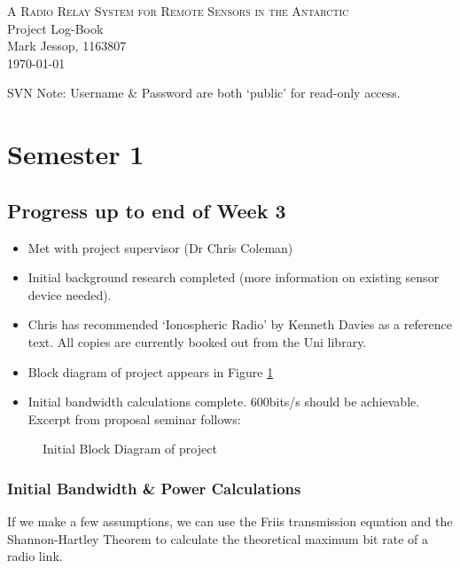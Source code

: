 \documentclass[a4paper,10pt]{article}
\begin{document}
 \begin{center}
	\textsc{\Large{
		A Radio Relay System for Remote Sensors in the Antarctic
	}}
	\ \\
	\Large{
		Project Log-Book
	}
	\ \\
	\large{
		Mark Jessop, 1163807
	}
	\ \\
	\today
 \end{center}
 SVN Note: Username \& Password are both `public' for read-only access.
 \tableofcontents
 \newpage
 
 
\section{Semester 1}
\subsection{Progress up to end of Week 3}
\begin{itemize}
\item Met with project supervisor (Dr Chris Coleman)
\item Initial background research completed (more information on existing sensor device needed).
\item Chris has recommended `Ionospheric Radio' by Kenneth Davies as a reference text. All copies are currently booked out from the Uni library.
\item Block diagram of project appears in Figure \ref{block_diag}
\item Initial bandwidth calculations complete. 600bits/s should be achievable. Excerpt from proposal seminar follows:
\end{itemize}
\begin{figure}[h]
\caption{Initial Block Diagram of project}
\label{block_diag}
\end{figure}
\subsubsection{Initial Bandwidth \& Power Calculations}
If we make a few assumptions, we can use the Friis transmission equation and the Shannon-Hartley Theorem to calculate the theoretical maximum bit rate of a radio link.
\end{document}
